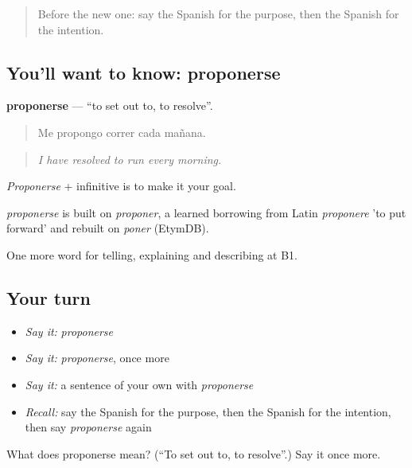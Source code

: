 \label{lesson:ES-C615-proponerse}



\begin{quote}
Before the new one: say the Spanish for the purpose, then the Spanish for the intention.
\end{quote}

\subsection*{You'll want to know: proponerse}
\textbf{proponerse} — \textquotedblleft{}to set out to, to resolve\textquotedblright{}.

\begin{quote}
Me propongo correr cada mañana.
\end{quote}

\begin{quote}
\emph{I have resolved to run every morning.}
\end{quote}

\emph{Proponerse} + infinitive is to make it your goal.

\begin{cousinweb}
\emph{proponerse} is built on \emph{proponer}, a learned borrowing from Latin \emph{proponere} 'to put forward' and rebuilt on \emph{poner} (EtymDB).
\end{cousinweb}

\begin{grammarlens}[title={What you've built}]
One more word for telling, explaining and describing at B1.
\end{grammarlens}

\subsection*{Your turn}
\begin{itemize}
\raggedright
  \item \emph{Say it:} \emph{proponerse}
  \item \emph{Say it:} \emph{proponerse}, once more
  \item \emph{Say it:} a sentence of your own with \emph{proponerse}
  \item \emph{Recall:} say the Spanish for the purpose, then the Spanish for the intention, then say \emph{proponerse} again
\end{itemize}

\begin{tcolorbox}[breakable,colback=teal!4,colframe=teal!35!black,title={Before you move on}]
What does proponerse mean? (\textquotedblleft{}To set out to, to resolve\textquotedblright{}.) Say it once more.
\end{tcolorbox}
